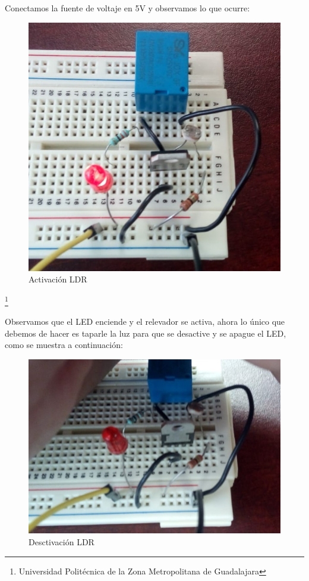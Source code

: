\documentclass[10pt,a4paper]{article}
\begin{document}
Conectamos la fuente de voltaje en 5V y observamos lo que ocurre: 
\begin{figure}[hbtp]
\centering
\includegraphics[scale=0.4]{Pictures/LDR1.jpeg}
\caption{Activación LDR}
\end{figure}
\footnote{Universidad Politécnica de la Zona Metropolitana de Guadalajara}

\newpage
 Observamos que el LED enciende y el relevador se activa, ahora lo único que debemos de hacer es taparle la luz para que se desactive y se apague el LED, como se muestra a continuación: 
 \begin{figure}[hbtp]
 \centering
 \includegraphics[scale=0.4]{Pictures/LDR2.jpeg}
 \caption{Desctivación LDR}
 \end{figure}
 
\end{document}
